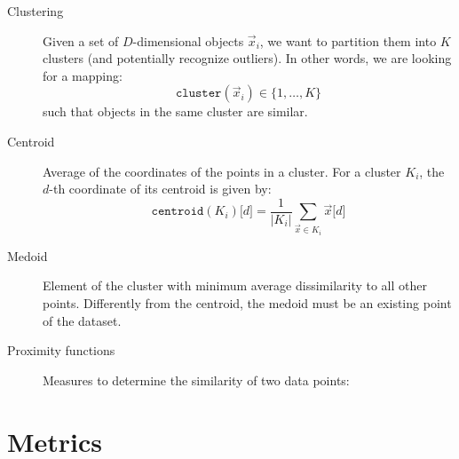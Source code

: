 \begin{description}
    \item[Clustering] 
        Given a set of $D$-dimensional objects $\vec{x}_i$, 
        we want to partition them into $K$ clusters (and potentially recognize outliers).
        In other words, we are looking for a mapping:
        \[ \texttt{cluster}(\vec{x}_i) \in \{ 1, \dots, K \} \]
        such that objects in the same cluster are similar.

    \item[Centroid] 
        Average of the coordinates of the points in a cluster.
        For a cluster $K_i$, the $d$-th coordinate of its centroid is given by:
        \[ 
            \texttt{centroid}(K_i)\texttt{[$d$]} 
                = \frac{1}{\vert K_i \vert} 
                    \sum_{\vec{x} \in K_i} \vec{x}\texttt{[$d$]} 
        \]

    \item[Medoid] 
        Element of the cluster with minimum average dissimilarity to all other points.
        Differently from the centroid, the medoid must be an existing point of the dataset.

    \item[Proximity functions]  
        Measures to determine the similarity of two data points:
\end{description}


\section{Metrics}

